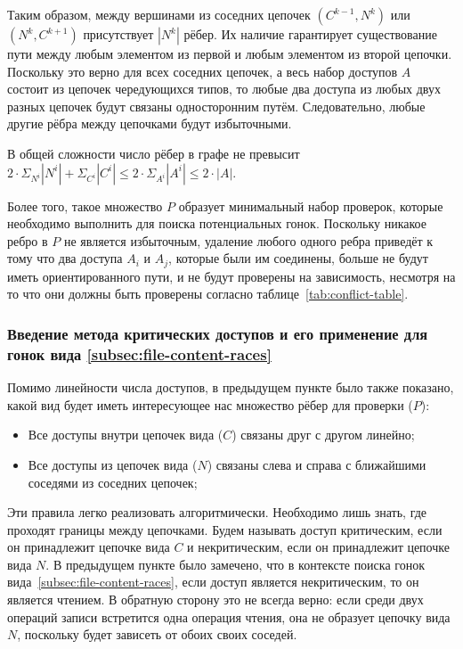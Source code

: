 Таким образом, между вершинами из соседних цепочек $(C^{k-1}, N^k)$ или $(N^k, C^{k+1})$ присутствует $|N^k|$ рёбер. Их наличие гарантирует существование пути между любым элементом из первой и любым элементом из второй цепочки. Поскольку это верно для всех соседних цепочек, а весь набор доступов $A$ состоит из цепочек чередующихся типов, то любые два доступа из любых двух разных цепочек будут связаны односторонним путём. Следовательно, любые другие рёбра между цепочками будут избыточными.

В общей сложности число рёбер в графе не превысит $2 \cdot \Sigma_{N^i} |N^i| + \Sigma_{C^i} |C^i| \leq 2 \cdot \Sigma_{A^i} |A^i| \leq 2 \cdot |A|$.

Более того, такое множество $P$ образует минимальный набор проверок, которые необходимо выполнить для поиска потенциальных гонок. Поскольку никакое ребро в $P$ не является избыточным, удаление любого одного ребра приведёт к тому что два доступа $A_i$ и $A_j$, которые были им соединены, больше не будут иметь ориентированного пути, и не будут проверены на зависимость, несмотря на то что они должны быть проверены согласно таблице~\ref{tab:conflict-table}.

\subsubsection{Введение метода критических доступов и его применение для гонок вида \ref{subsec:file-content-races}}

Помимо линейности числа доступов, в предыдущем пункте было также показано, какой вид будет иметь интересующее нас множество рёбер для проверки ($P$):

\begin{itemize}
    \item Все доступы внутри цепочек вида ($C$) связаны друг с другом линейно;
    \item Все доступы из цепочек вида ($N$) связаны слева и справа с ближайшими соседями из соседних цепочек;
\end{itemize}

Эти правила легко реализовать алгоритмически. Необходимо лишь знать, где проходят границы между цепочками. Будем называть доступ критическим, если он принадлежит цепочке вида $C$ и некритическим, если он принадлежит цепочке вида $N$. В предыдущем пункте было замечено, что в контексте поиска гонок вида~\ref{subsec:file-content-races}, если доступ является некритическим, то он является чтением. В обратную сторону это не всегда верно: если среди двух операций записи встретится одна операция чтения, она не образует цепочку вида $N$, поскольку будет зависеть от обоих своих соседей.

